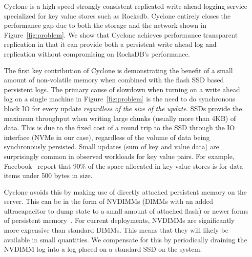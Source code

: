 \documentclass[pageno]{jpaper}
\begin{document}
Cyclone is a high speed strongly consistent replicated write ahead logging
service specialized for key value stores such as Rocksdb. Cyclone entirely
closes the performance gap due to both the storage and the network shown in
Figure~\ref{fig:problem}. We show that Cyclone achieves performance transparent
replication in that it can provide both a persistent write ahead log and
replication without compromising on RocksDB's performance.

The first key contribution of Cyclone is demonstrating the benefit of a small
amount of non-volatile memory when combined with the flash SSD based persistent
logs.  The primary cause of slowdown when turning on a write ahead log on a
single machine in Figure~\ref{fig:problem} is the need to do synchronous block
IO for every update \emph{regardless of the size of the update}. SSDs provide
the maximum throughput when writing large chunks (usually more than 4KB) of
data. This is due to the fixed cost of a round trip to the SSD through the IO
interface (NVMe in our case), regardless of the volume of data being
synchronously persisted. Small updates (sum of key and value data) are
surprisingly common in observed workloads for key value pairs. For example,
Facebook~\cite{fb_workload_analysis} report that 90\% of the space allocated in
key value stores is for data items under 500 bytes in size.

Cyclone avoids this by making use of directly attached
persistent memory on the server. This can be in the form of NVDIMMs (DIMMs with
an added ultracapacitor to dump state to a small amount of attached flash) or
newer forms of persistent memory~\cite{pmfs}. For current deployments, NVDIMMs
are significantly more expensive than standard DIMMs. This means that they will
likely be available in small quantities. We compensate for this by periodically
draining the NVDIMM log into a log placed on a standard SSD on the system.
\end{document}
